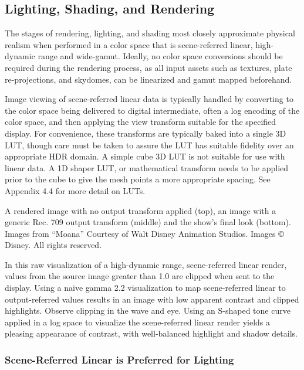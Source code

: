 \subsection{Lighting, Shading, and Rendering}%
\label{subsec:lighting-shading-and-rendering}

The stages of rendering, lighting, and shading most closely approximate physical realism when performed in a color space that is scene-referred linear, high-dynamic range and wide-gamut. Ideally, no color space conversions should be required during the rendering process, as all input assets such as textures, plate re-projections, and skydomes, can be linearized and gamut mapped beforehand.

Image viewing of scene-referred linear data is typically handled by converting to the color space being delivered to digital intermediate, often a log encoding of the color space, and then applying the view transform suitable for the specified display. For convenience, these transforms are typically baked into a single 3D LUT, though care must be taken to assure the LUT has suitable fidelity over an appropriate HDR domain. A simple cube 3D LUT is not suitable for use with linear data. A 1D shaper LUT, or mathematical transform needs to be applied prior to the cube to give the mesh points a more appropriate spacing. See Appendix 4.4 for more detail on LUTs.



A rendered image with no output transform applied (top), an image with a generic Rec. 709 output transform (middle) and the show’s final look (bottom).
Images from “Moana” Courtesy of Walt Disney Animation Studios. Images © Disney. All rights reserved.

In this raw visualization of a high-dynamic range, scene-referred linear render, values from the source image greater than 1.0 are clipped when sent to the display. Using a naive gamma 2.2 visualization to map scene-referred linear to output-referred values results in an image with low apparent contrast and clipped highlights. Observe clipping in the wave and eye. Using an S-shaped tone curve applied in a log space to visualize the scene-referred linear render yields a pleasing appearance of contrast, with well-balanced highlight and shadow details.

\subsubsection{Scene-Referred Linear is Preferred for Lighting}%
\label{subsubsec:scene-referred-linear-is-preferred-for-lighting}

